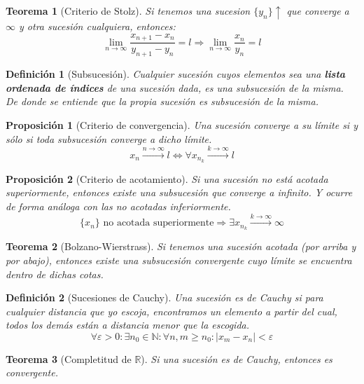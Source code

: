 \documentclass[10pt,a4paper,openright]{book}
\newtheorem{teorema}{Teorema}[chapter]
\newtheorem{proposicion}{Proposición}[chapter]
\newtheorem{definicion}{Definición}[chapter]
\begin{document}
\begin{teorema}[Criterio de Stolz]
Si tenemos una sucesion $\{y_n\}\uparrow$ que converge a $\infty$ y otra sucesión cualquiera, entonces:
$$\lim_{n\rightarrow \infty}\frac{x_{n+1}-x_n}{y_{n+1}-y_n}=l\Rightarrow \lim_{n\rightarrow \infty} \frac{x_n}{y_n}=l $$
\end{teorema}

\begin{definicion}[Subsucesión]
Cualquier sucesión cuyos elementos sea una \textbf{lista ordenada de índices} de una sucesión dada, es una subsucesión de la misma. De donde se entiende que la propia sucesión es subsucesión de la misma.
\end{definicion}

\begin{proposicion}[Criterio de convergencia]
Una sucesión converge a su límite si y sólo si toda subsucesión converge a dicho límite.
$$x_n\xrightarrow{n\rightarrow \infty}l\Leftrightarrow \forall x_{n_k}\xrightarrow{k\rightarrow \infty} l$$
\end{proposicion}

\begin{proposicion}[Criterio de acotamiento]
Si una sucesión no está acotada superiormente, entonces existe una subsucesión que converge a infinito. Y ocurre de forma análoga con las no acotadas inferiormente.
$$\{x_n\}\mbox{ no acotada superiormente}\Rightarrow \exists x_{n_k}\xrightarrow{k\rightarrow \infty} \infty$$
\end{proposicion}

\begin{teorema}[Bolzano-Wierstrass]
Si tenemos una sucesión acotada (por arriba y por abajo), entonces existe una subsucesión convergente cuyo límite se encuentra dentro de dichas cotas.
\end{teorema}

\begin{definicion}[Sucesiones de Cauchy]
Una sucesión es de Cauchy si para cualquier distancia que yo escoja, encontramos un elemento a partir del cual, todos los demás están a distancia menor que la escogida.
$$\forall \varepsilon>0: \exists n_0\in \mathbb N : \forall n,m\geq n_0: |x_m-x_n|<\varepsilon$$
\end{definicion}

\begin{teorema}[Completitud de $\mathbb R$]
Si una sucesión es de Cauchy, entonces es convergente.
\end{teorema}
\end{document}

